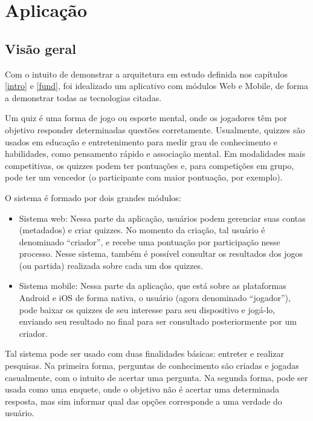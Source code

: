 \chapter{Aplicação} \label{CHP:APP}%
 
\section{Visão geral}
        Com o intuito de demonstrar a arquitetura em estudo definida nos capítulos \ref{intro} e \ref{fund}, foi idealizado um aplicativo com módulos Web e Mobile, de forma a demonstrar todas as tecnologias citadas.
		
        Um quiz é uma forma de jogo ou esporte mental, onde os jogadores têm por objetivo responder determinadas questões corretamente. Usualmente, quizzes são usados em educação e entretenimento para medir grau de conhecimento e habilidades, como pensamento rápido e associação mental. Em modalidades mais competitivas, os quizzes podem ter pontuações e, para competições em grupo, pode ter um vencedor (o participante com maior pontuação, por exemplo).
		
		O sistema é formado por dois grandes módulos:
\begin{itemize}
\item Sistema web: Nessa parte da aplicação, usuários podem gerenciar suas contas (metadados) e criar quizzes. No momento da criação, tal usuário é denominado ``criador'', e recebe uma pontuação por participação nesse processo. Nesse sistema, também é possível consultar os resultados dos jogos (ou partida) realizada sobre cada um dos quizzes.
\item Sistema mobile: Nessa parte da aplicação, que está sobre as plataformas Android e iOS de forma nativa, o usuário (agora denominado ``jogador''), pode baixar os quizzes de seu interesse para seu dispositivo e jogá-lo, enviando seu resultado no final para ser consultado posteriormente por um criador.
\end{itemize} 
Tal sistema pode ser usado com duas finalidades básicas: entreter e realizar pesquisas. Na primeira forma, perguntas de conhecimento são criadas e jogadas casualmente, com o intuito de acertar uma pergunta. Na segunda forma, pode ser usada como uma enquete, onde o objetivo não é acertar uma determinada resposta, mas sim informar qual das opções corresponde a uma verdade do usuário.
 
